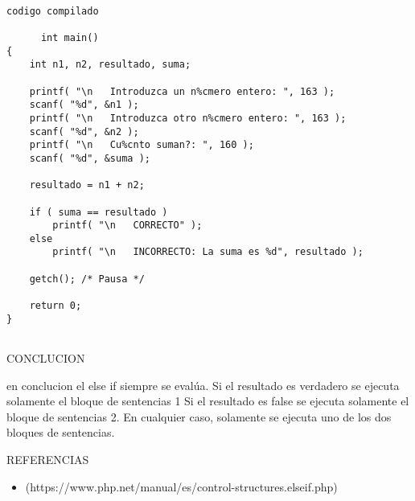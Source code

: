 \documentclass[letterpaper,12pt]{article}
\begin{document}
\begin{verbatim}

codigo compilado 

      int main()
{
    int n1, n2, resultado, suma;

    printf( "\n   Introduzca un n%cmero entero: ", 163 );
    scanf( "%d", &n1 );
    printf( "\n   Introduzca otro n%cmero entero: ", 163 );
    scanf( "%d", &n2 );
    printf( "\n   Cu%cnto suman?: ", 160 );
    scanf( "%d", &suma );

    resultado = n1 + n2;

    if ( suma == resultado )
        printf( "\n   CORRECTO" );
    else
        printf( "\n   INCORRECTO: La suma es %d", resultado );

    getch(); /* Pausa */

    return 0;
}
	
\end{verbatim}


CONCLUCION

en conclucion el else if siempre  se evalúa.
Si el resultado es verdadero se ejecuta solamente el bloque de sentencias 1
Si el resultado es false se ejecuta solamente el bloque de sentencias 2.
En cualquier caso, solamente se ejecuta uno de los dos bloques de sentencias.


REFERENCIAS 


\begin{itemize}

\item (https://www.php.net/manual/es/control-structures.elseif.php)

\end{itemize}
\end{document}
